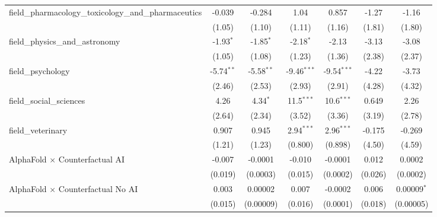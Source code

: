 \begin{tabular}{lcccccc}
   field\_pharmacology\_toxicology\_and\_pharmaceutics         & -0.039        & -0.284        & 1.04          & 0.857         & -1.27        & -1.16\\   
                                                               & (1.05)        & (1.10)        & (1.11)        & (1.16)        & (1.81)       & (1.80)\\   
   field\_physics\_and\_astronomy                              & -1.93$^{*}$   & -1.85$^{*}$   & -2.18$^{*}$   & -2.13         & -3.13        & -3.08\\   
                                                               & (1.05)        & (1.08)        & (1.23)        & (1.36)        & (2.38)       & (2.37)\\   
   field\_psychology                                           & -5.74$^{**}$  & -5.58$^{**}$  & -9.46$^{***}$ & -9.54$^{***}$ & -4.22        & -3.73\\   
                                                               & (2.46)        & (2.53)        & (2.93)        & (2.91)        & (4.28)       & (4.32)\\   
   field\_social\_sciences                                     & 4.26          & 4.34$^{*}$    & 11.5$^{***}$  & 10.6$^{***}$  & 0.649        & 2.26\\   
                                                               & (2.64)        & (2.34)        & (3.52)        & (3.36)        & (3.19)       & (2.78)\\   
   field\_veterinary                                           & 0.907         & 0.945         & 2.94$^{***}$  & 2.96$^{***}$  & -0.175       & -0.269\\   
                                                               & (1.21)        & (1.23)        & (0.800)       & (0.898)       & (4.50)       & (4.59)\\   
   AlphaFold $\times$ Counterfactual AI                        & -0.007        & -0.0001       & -0.010        & -0.0001       & 0.012        & 0.0002\\   
                                                               & (0.019)       & (0.0003)      & (0.015)       & (0.0002)      & (0.026)      & (0.0002)\\   
   AlphaFold $\times$ Counterfactual No AI                     & 0.003         & 0.00002       & 0.007         & -0.0002       & 0.006        & 0.00009$^{*}$\\   
                                                               & (0.015)       & (0.00009)     & (0.016)       & (0.0001)      & (0.018)      & (0.00005)\\   

\end{tabular}
